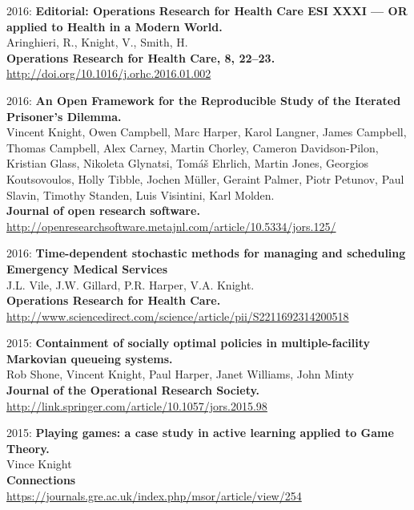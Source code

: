 \documentclass[10pt]{res} %
\begin{document}
\begin{resume}
\begin{etaremune}
\item
2016: \textbf{Editorial: Operations Research for Health Care ESI XXXI — OR applied to Health in a Modern World.}\\
Aringhieri, R., Knight, V., Smith, H.
\\
\textbf{Operations Research for Health Care, 8, 22–23.}
\\
\url{http://doi.org/10.1016/j.orhc.2016.01.002}
\\

\item
2016: \textbf{An Open Framework for the Reproducible Study of the Iterated Prisoner’s Dilemma.}\\
Vincent Knight, Owen Campbell, Marc Harper, Karol Langner, James Campbell, Thomas Campbell, Alex Carney, Martin Chorley, Cameron Davidson-Pilon, Kristian Glass, Nikoleta Glynatsi, Tomáš Ehrlich, Martin Jones, Georgios Koutsovoulos, Holly Tibble, Jochen Müller, Geraint Palmer, Piotr Petunov, Paul Slavin, Timothy Standen, Luis Visintini, Karl Molden.
\\
\textbf{Journal of open research software.}
\\
\url{http://openresearchsoftware.metajnl.com/article/10.5334/jors.125/}
\\

\item
2016: \textbf{Time-dependent stochastic methods for managing and scheduling Emergency Medical Services}\\
J.L. Vile, J.W. Gillard, P.R. Harper, V.A. Knight.
\\
\textbf{Operations Research for Health Care.}
\\
\url{http://www.sciencedirect.com/science/article/pii/S2211692314200518}
\\

\item
2015: \textbf{Containment of socially optimal policies in multiple-facility Markovian queueing systems.}\\
Rob Shone, Vincent Knight, Paul Harper, Janet Williams, John Minty
\\
\textbf{Journal of the Operational Research Society.}
\\
\url{http://link.springer.com/article/10.1057/jors.2015.98}
\\

\item
2015: \textbf{Playing games: a case study in active learning applied to Game Theory.}\\
Vince Knight
\\
\textbf{Connections}
\\
\url{https://journals.gre.ac.uk/index.php/msor/article/view/254}
\\


\end{etaremune}
\end{resume}
\end{document}
